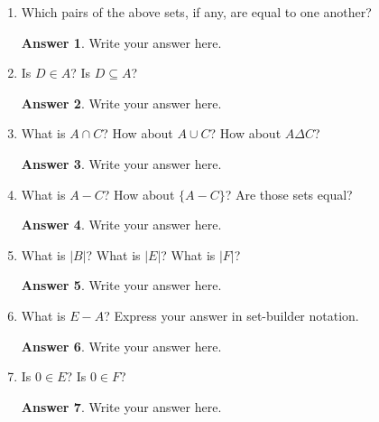 \documentclass{article}
\renewcommand{\(}{\left(}
\renewcommand{\)}{\right)}
\theoremstyle{plain}
\theoremstyle{plain}
\theoremstyle{definition}
\newtheorem*{answer}{Answer}
\begin{document}
\begin{enumerate}[label*=\roman*.,ref=\roman*]

\item Which pairs of the above sets, if any, are equal to one another?

\begin{shaded}
\begin{answer}
Write your answer here.
\end{answer}
\end{shaded}

\item Is $D \in A$? Is $D \subseteq A$?

\begin{shaded}
\begin{answer}
Write your answer here.
\end{answer}
\end{shaded}

\item What is $A \cap C$? How about $A \cup C$? How about $A \Delta C$?

\begin{shaded}
\begin{answer}
Write your answer here.
\end{answer}
\end{shaded}

\item What is $A - C$? How about $\{A - C\}$? Are those sets equal?

\begin{shaded}
\begin{answer}
Write your answer here.
\end{answer}
\end{shaded}

\item What is $|B|$? What is $|E|$? What is $|F|$?

\begin{shaded}
\begin{answer}
Write your answer here.
\end{answer}
\end{shaded}

\item What is $E - A$? Express your answer in set-builder notation.

\begin{shaded}
\begin{answer}
Write your answer here.
\end{answer}
\end{shaded}

\item Is $0 \in E$? Is $0 \in F$?

\begin{shaded}
\begin{answer}
Write your answer here.
\end{answer}
\end{shaded}

\end{enumerate}
\end{document}
